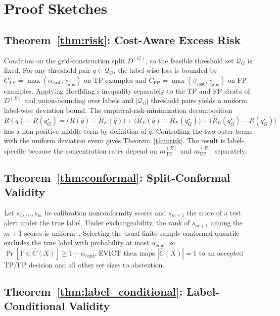 \section{Proof Sketches}
\label{app:proofs}

\subsection{Theorem~\ref{thm:risk}: Cost-Aware Excess Risk}

Condition on the grid-construction split $D^{(G)}$, so the feasible threshold set $\mathcal Q_G$ is fixed. For any threshold pair $q\in\mathcal Q_G$, the label-wise loss is bounded by $C_{\mathrm{TP}}=\max(\alpha_{\mathrm{cost}},\gamma_{\mathrm{abs}})$ on TP examples and $C_{\mathrm{FP}}=\max(\beta_{\mathrm{cost}},\gamma_{\mathrm{abs}})$ on FP examples. Applying Hoeffding's inequality separately to the TP and FP strata of $D^{(E)}$ and union-bounding over labels and $|\mathcal Q_G|$ threshold pairs yields a uniform label-wise deviation bound. The empirical-risk-minimization decomposition
\[
R(\hat q)-R(q_G^\star)=
\bigl(R(\hat q)-\hat R_E(\hat q)\bigr)+
\bigl(\hat R_E(\hat q)-\hat R_E(q_G^\star)\bigr)+
\bigl(\hat R_E(q_G^\star)-R(q_G^\star)\bigr)
\]
has a non-positive middle term by definition of $\hat q$. Controlling the two outer terms with the uniform deviation event gives Theorem~\ref{thm:risk}. The result is label-specific because the concentration rates depend on $m^{(E)}_{\mathrm{TP}}$ and $m^{(E)}_{\mathrm{FP}}$ separately.

\subsection{Theorem~\ref{thm:conformal}: Split-Conformal Validity}

Let $s_1,\ldots,s_m$ be calibration nonconformity scores and $s_{m+1}$ the score of a test alert under the true label. Under exchangeability, the rank of $s_{m+1}$ among the $m+1$ scores is uniform~\cite{vovk2005}. Selecting the usual finite-sample conformal quantile excludes the true label with probability at most $\alpha_{\mathrm{conf}}$, so $\Pr[Y\in\hat C(X)]\ge 1-\alpha_{\mathrm{conf}}$. EVICT then maps $|\hat C(X)|=1$ to an accepted TP/FP decision and all other set sizes to abstention.

\subsection{Theorem~\ref{thm:label_conditional}: Label-Conditional Validity}

